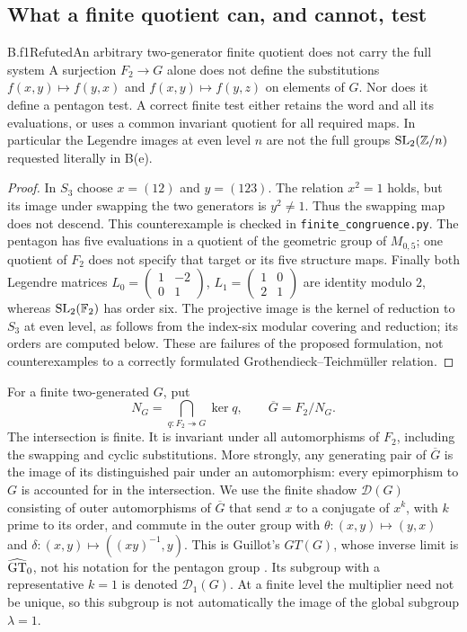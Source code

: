 \subsection{What a finite quotient can, and cannot, test}

\begin{claim}{B.f1}{Refuted}{An arbitrary two-generator finite quotient does not carry the full system}
A surjection $F_2\to G$ alone does not define the substitutions
$f(x,y)\mapsto f(y,x)$ and $f(x,y)\mapsto f(y,z)$ on elements of $G$.
Nor does it define a pentagon test. A correct finite test either retains
the word and all its evaluations, or uses a common invariant quotient for
all required maps. In particular the Legendre images at even level $n$
are not the full groups $\operatorname{SL}_2(\mathbb Z/n)$ requested literally in B(e).
\end{claim}

\begin{proof}
In $S_3$ choose $x=(12)$ and $y=(123)$. The relation $x^2=1$ holds,
but its image under swapping the two generators is $y^2\ne1$.
Thus the swapping map does not descend. This counterexample is checked
in \nolinkurl{finite_congruence.py}. The pentagon has five evaluations in
a quotient of the geometric group of $M_{0,5}$; one quotient of $F_2$
does not specify that target or its five structure maps. Finally both
Legendre matrices $L_0=\left(\begin{smallmatrix}1&-2\\0&1\end{smallmatrix}\right)$,
$L_1=\left(\begin{smallmatrix}1&0\\2&1\end{smallmatrix}\right)$ are
identity modulo $2$, whereas $\operatorname{SL}_2(\mathbb F_2)$ has order six.
The projective image is the kernel of reduction to $S_3$ at even level,
as follows from the index-six modular covering and reduction; its orders
are computed below. These are failures of the proposed formulation, not
counterexamples to a correctly formulated Grothendieck--Teichm\"uller relation.
\end{proof}

For a finite two-generated $G$, put
\[
 N_G=\bigcap_{q:F_2\twoheadrightarrow G}\ker q,
 \qquad \overline G=F_2/N_G.
\]
The intersection is finite. It is invariant under all automorphisms of
$F_2$, including the swapping and cyclic substitutions. More strongly,
any generating pair of $\overline G$ is the image of its distinguished
pair under an automorphism: every epimorphism to $G$ is accounted for in
the intersection. We use the finite shadow $\mathcal D(G)$ consisting of
outer automorphisms of $\overline G$ that send $x$ to a conjugate of
$x^k$, with $k$ prime to its order, and commute in the outer group with
$\theta:(x,y)\mapsto(y,x)$ and
$\delta:(x,y)\mapsto((xy)^{-1},y)$. This is Guillot's $GT(G)$, whose
inverse limit is $\widehat{\mathrm{GT}}_0$, not his notation for the pentagon group
\citep[\S\S2.1--2.4]{Guillot2015root}. Its subgroup with a representative
$k=1$ is denoted $\mathcal D_1(G)$. At a finite level the multiplier need
not be unique, so this subgroup is not automatically the image of the
global subgroup $\lambda=1$.

